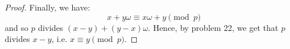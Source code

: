 \begin{proof}
    Finally, we have:
    \[ x+y\omega \equiv x\omega + y \pmod{p} \]
    and so $p$ divides $(x-y) + (y-x)\omega$. Hence, by problem 22, we get that $p$ divides $x-y$, i.e. $x \equiv y \pmod{p}$.
\end{proof}